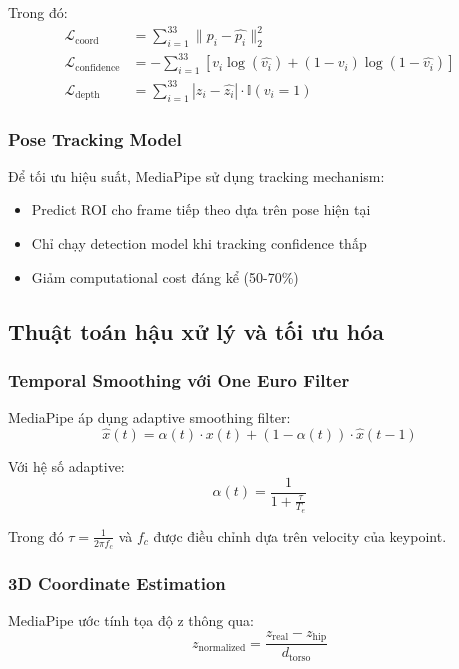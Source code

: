 Trong đó:
\begin{align}
\mathcal{L}_{\text{coord}} &= \sum_{i=1}^{33} \|p_i - \hat{p_i}\|_2^2 \\
\mathcal{L}_{\text{confidence}} &= -\sum_{i=1}^{33} [v_i \log(\hat{v_i}) + (1-v_i)\log(1-\hat{v_i})] \\
\mathcal{L}_{\text{depth}} &= \sum_{i=1}^{33} |z_i - \hat{z_i}| \cdot \mathbb{I}(v_i = 1)
\end{align}

\subsubsection{Pose Tracking Model}
Để tối ưu hiệu suất, MediaPipe sử dụng tracking mechanism:
\begin{itemize}
    \item Predict ROI cho frame tiếp theo dựa trên pose hiện tại
    \item Chỉ chạy detection model khi tracking confidence thấp
    \item Giảm computational cost đáng kể (50-70\%)
\end{itemize}

\subsection{Thuật toán hậu xử lý và tối ưu hóa}

\subsubsection{Temporal Smoothing với One Euro Filter}
MediaPipe áp dụng adaptive smoothing filter:
\begin{equation}
\hat{x}(t) = \alpha(t) \cdot x(t) + (1 - \alpha(t)) \cdot \hat{x}(t-1)
\end{equation}

Với hệ số adaptive:
\begin{equation}
\alpha(t) = \frac{1}{1 + \frac{\tau}{T_e}}
\end{equation}

Trong đó $\tau = \frac{1}{2\pi f_c}$ và $f_c$ được điều chỉnh dựa trên velocity của keypoint.

\subsubsection{3D Coordinate Estimation}
MediaPipe ước tính tọa độ z thông qua:
\begin{equation}
z_{\text{normalized}} = \frac{z_{\text{real}} - z_{\text{hip}}}{d_{\text{torso}}}
\end{equation}

